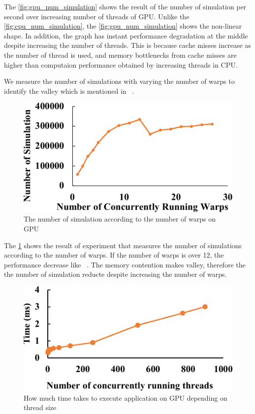 \documentclass[conference]{IEEEtran}
\begin{document}
The \cref{fig:gpu_num_simulation} shows the result of the number of simulation per second over increasing number of threads of GPU. 
Unlike the \cref{fig:cpu_num_simulation}, the \cref{fig:gpu_num_simulation} shows the non-linear shape. 
In addition, the graph has instant performance degradation at the middle despite increasing the number of threads. 
This is because cache misses increase as the number of thread is used, and memory bottlenecks from cache misses are higher than computaion performance obtained by increasing threads in CPU.

We measure the number of simulations with varying the number of warps to identify the valley which is mentioned in ~\cite{hpca2015valley}. 
\begin{figure}
\includegraphics[width=0.95\columnwidth]{figures/gpu_warp_simulation.pdf}
\caption{The number of simulation according to the number of warps on GPU}
\label{fig:gpu_warp_simulation}
\end{figure}

The \cref{fig:gpu_warp_simulation} shows the result of experiment that measures the number of simulations according to the number of warps. 
If the number of warps is over 12, the performance decrease like ~\cite{hpca2015valley}. 
The memory contention makes valley, therefore the the number of simulation reducte despite increasing the number of warps. 

\begin{figure}
\includegraphics[width=0.95\columnwidth]{figures/gpu_thread_time.pdf}
\caption{How much time takes to execute application on GPU depending on thread size}
\label{fig:gpu_thread_time}
\end{figure}
\end{document}
